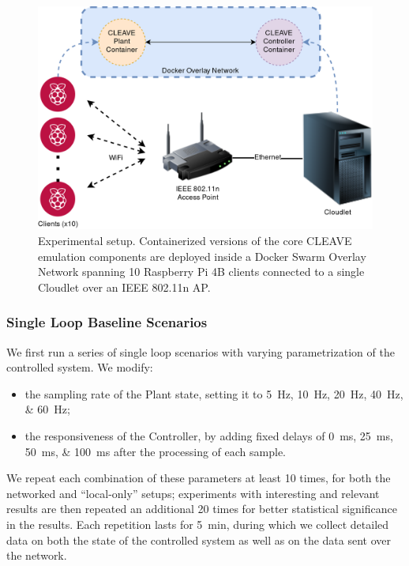 \begin{figure}
    \centering
    \includegraphics[width=.95\columnwidth]{images/CLEAVE_experiment_setup}
    \caption{Experimental setup. Containerized versions of the core CLEAVE emulation components are deployed inside a Docker Swarm Overlay Network spanning \num{10} Raspberry Pi 4B clients connected to a single Cloudlet over an IEEE 802.11n \ac{AP}.}\label{fig:cleave:expsetup}
\end{figure}

\subsubsection{Single Loop Baseline Scenarios}

We first run a series of single loop scenarios with varying parametrization of the controlled system.
We modify:
\begin{itemize}
    \item the sampling rate of the Plant state, setting it to \SIlist[list-final-separator={, or }]{5;10;20;40;60}{\hertz};
    \item the responsiveness of the Controller, by adding fixed delays of  \SIlist[list-final-separator={, or }]{0;25;50;100}{\milli\second} after the processing of each sample.
\end{itemize}
We repeat each combination of these parameters at least \num{10} times, for both the networked and ``local-only'' setups; experiments with interesting and relevant results are then repeated an additional \num{20} times for better statistical significance in the results.
Each repetition lasts for \SI{5}{\minute}, during which we collect detailed data on both the state of the controlled system as well as on the data sent over the network.

